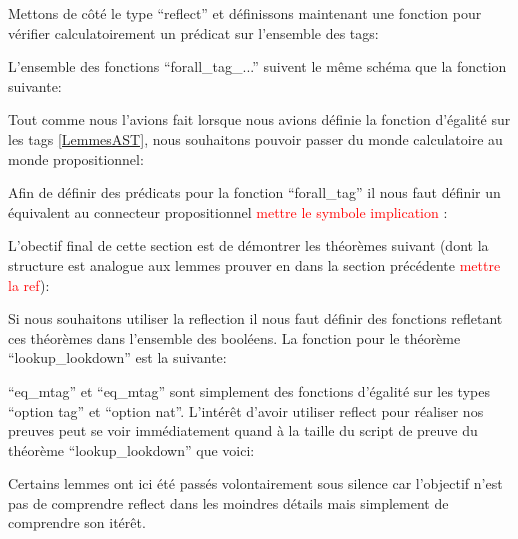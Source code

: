 \documentclass {article}
\newcommand{\codefrom}[3]
           {}
\theoremstyle{definition}
\theoremstyle{remark}
\newcommand{\todo}[1]{\textcolor{red}{#1}}
\begin{document}
\codefrom{rapport}{definitions}{reflect_iff}


Mettons de côté le type ``reflect'' et définissons maintenant une fonction
pour vérifier calculatoirement un prédicat sur l'ensemble des tags:

\codefrom{src}{association_list}{forall_tag}

L'ensemble des fonctions ``forall\_tag\_...'' suivent le même schéma que la fonction suivante:

\codefrom{src}{association_list}{forall_tag_uno}

Tout comme nous l'avions fait lorsque nous avions définie la fonction d'égalité sur les tags \ref{LemmesAST},
nous souhaitons pouvoir passer du monde calculatoire au monde propositionnel:

\codefrom{src}{association_list}{helpBefore1}
\codefrom{src}{association_list}{helpBefore2}

Afin de définir des prédicats pour la fonction ``forall\_tag'' il nous faut définir un
équivalent au connecteur propositionnel \todo{mettre le symbole implication} :

\codefrom{src}{association_list}{imply}

L'obectif final de cette section est de démontrer les théorèmes suivant (dont la structure est analogue aux lemmes prouver
en dans la section précédente \todo{mettre la ref}):

\codefrom{src}{association_list}{lookup_lookdown}
\codefrom{src}{association_list}{lookdown_lookup}


Si nous souhaitons utiliser la reflection il nous faut définir des fonctions refletant
ces théorèmes dans l'ensemble des booléens. La fonction pour le théorème ``lookup\_lookdown''
est la suivante:

\codefrom{src}{association_list}{lookup_encdec}
``eq\_mtag'' et ``eq\_mtag'' sont simplement des fonctions d'égalité sur les types ``option tag'' et ``option nat''.
L'intérêt d'avoir utiliser reflect pour réaliser nos preuves peut se voir immédiatement quand à la taille
du script de preuve du théorème ``lookup\_lookdown'' que voici:

\codefrom{src}{association_list}{lookup_lookdown}

\codefrom{src}{association_list}{lookup_lookdown_script}

Certains lemmes ont ici été passés volontairement sous silence car l'objectif n'est pas
de comprendre reflect dans les moindres détails mais simplement de comprendre son itérêt.
\end{document}
